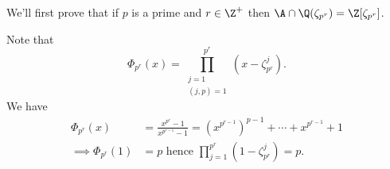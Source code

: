 We'll first prove that if $p$ is a prime and $r\in\Z^+$ then $\A\cap\Q(\zeta_{p^r})=\Z[\zeta_{p^r}]$.

Note that
\[ \Phi_{p^r}(x) = \prod_{\substack{j=1\\(j,p)=1}}^{p^r}(x-\zeta^j_{p^r}) . \]
We have
\begin{align*}
\Phi_{p^r}(x) &= \frac{x^{p^r}-1}{x^{p^{r-1}}-1} = (x^{p^{r-1}})^{p-1} + \dotsb + x^{p^{r-1}} + 1 \\
\implies \Phi_{p^r}(1) &= p \text{ hence } \prod_{j=1}^{p^r}(1-\zeta_{p^r}^j) = p .
\end{align*}
